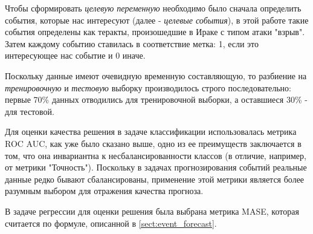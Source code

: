 Чтобы сформировать \textit{целевую переменную} необходимо было сначала определить события, которые нас интересуют (далее - \textit{целевые события}), в этой работе такие события определены как теракты, произошедшие в Ираке с типом атаки "взрыв". Затем каждому событию ставилась в соответствие метка: 1, если это интересующее нас событие и 0 иначе. 


Поскольку данные имеют очевидную временную составляющую, то разбиение на \textit{тренировочную} и \textit{тестовую} выборку производилось строго последовательно: первые 70\% данных отводились для тренировочной выборки, а оставшиеся 30\% - для тестовой.

Для оценки качества решения в задаче классификации использовалась метрика ROC AUC, как уже было сказано выше, одно из ее преимуществ заключается в том, что она инвариантна к несбалансированности классов (в отличие, например, от метрики "Точность"). Поскольку в задачах прогнозирования событий реальные данные редко бывают сбалансированы, применение этой метрики является более разумным выбором для отражения качества прогноза.

В задаче регрессии для оценки решения была выбрана метрика MASE, которая считается по формуле, описанной в \ref{sect:event_forecast}.

